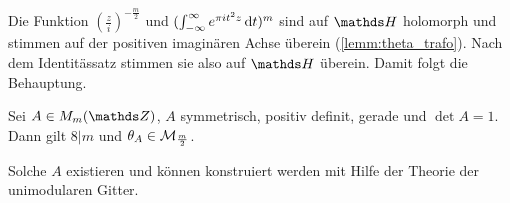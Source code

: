 \begin{bewe}
Die Funktion $(\frac{z}{i})^{-\frac{m}{2}}$ und $(\int_{-\infty}^\infty e^{\pi i t^2 z} \,\mathrm{d} t)^m$ sind auf $\HH$ holomorph und stimmen auf der positiven imaginären Achse überein (\autoref{lemm:theta_trafo}).
Nach dem Identitässatz stimmen sie also auf $\HH$ überein.
Damit folgt die Behauptung.
\end{bewe}

\begin{satz}
Sei $A \in M_m(\ZZ)$, $A$ symmetrisch, positiv definit, gerade und $\det A = 1$.
Dann gilt $8 | m$ und $\theta_A \in \mathcal{M}_{\frac{m}{2}}$.
\end{satz}
\begin{beme}
Solche $A$ existieren und können konstruiert werden mit Hilfe der Theorie der unimodularen Gitter.
\end{beme}

